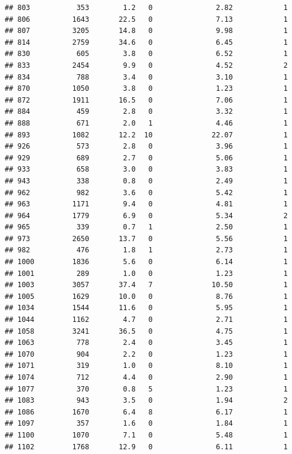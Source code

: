 \documentclass[
]{article}
\begin{document}
\begin{verbatim}
## 803           353        1.2   0               2.82            1
## 806          1643       22.5   0               7.13            1
## 807          3205       14.8   0               9.98            1
## 814          2759       34.6   0               6.45            1
## 830           605        3.8   0               6.52            1
## 833          2454        9.9   0               4.52            2
## 834           788        3.4   0               3.10            1
## 870          1050        3.8   0               1.23            1
## 872          1911       16.5   0               7.06            1
## 884           459        2.8   0               3.32            1
## 888           671        2.0   1               4.46            1
## 893          1082       12.2  10              22.07            1
## 926           573        2.8   0               3.96            1
## 929           689        2.7   0               5.06            1
## 933           658        3.0   0               3.83            1
## 943           338        0.8   0               2.49            1
## 962           982        3.6   0               5.42            1
## 963          1171        9.4   0               4.81            1
## 964          1779        6.9   0               5.34            2
## 965           339        0.7   1               2.50            1
## 973          2650       13.7   0               5.56            1
## 982           476        1.8   1               2.73            1
## 1000         1836        5.6   0               6.14            1
## 1001          289        1.0   0               1.23            1
## 1003         3057       37.4   7              10.50            1
## 1005         1629       10.0   0               8.76            1
## 1034         1544       11.6   0               5.95            1
## 1044         1162        4.7   0               2.71            1
## 1058         3241       36.5   0               4.75            1
## 1063          778        2.4   0               3.45            1
## 1070          904        2.2   0               1.23            1
## 1071          319        1.0   0               8.10            1
## 1074          712        4.4   0               2.90            1
## 1077          370        0.8   5               1.23            1
## 1083          943        3.5   0               1.94            2
## 1086         1670        6.4   8               6.17            1
## 1097          357        1.6   0               1.84            1
## 1100         1070        7.1   0               5.48            1
## 1102         1768       12.9   0               6.11            1

\end{verbatim}
\end{document}
